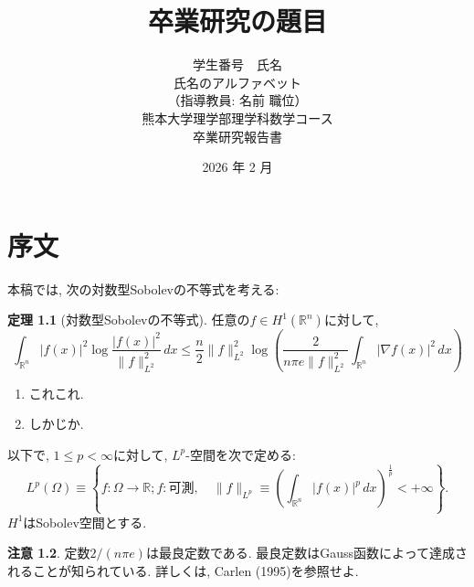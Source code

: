 \documentclass[12pt,a4j,twoside]{jreport}
\numberwithin{equation}{chapter}
\theoremstyle{definition} %
\newtheorem{thm}{定理}[chapter]
\newtheorem{rem}[thm]{注意}
\newcommand{\R}{{\mathbb R}} %
\newcommand{\nab}{\nabla} %
\newcommand{\Om}{\Omega} %
\newcommand{\eqn}[1]{\begin{equation}#1\end{equation}}
\begin{document}
\title{ %
\huge 卒業研究の題目 \\[5cm]
}
\author{学生番号　氏名 \\
\qquad\qquad\quad 氏名のアルファベット\\[1cm]
（指導教員: 名前 職位） \\[1cm]
熊本大学理学部理学科数学コース \\
卒業研究報告書}
\date{\Large 2026 年 2 月} %
\maketitle %
\thispagestyle{empty} 
\clearpage
\tableofcontents %
\thispagestyle{empty}
\newpage
\setcounter{page}{1}
\renewcommand{\thepage}{\arabic{page}} 


\chapter{序文}%

本稿では, 次の対数型Sobolevの不等式を考える: 

\begin{thm}[対数型Sobolevの不等式] \label{thm:dareka}
任意の$f \in H^1(\R^n)$に対して, 
\eqn{
   \int_{\R^n} |f(x)|^2 \log\frac{|f(x)|^2}{\|f\|_{L^2}^2}\, dx
   \leq \frac{n}{2} \|f\|_{L^2}^2 \log\left(\frac{2}{n \pi e \|f\|_{L^2}^2} \int_{\R^n} |\nab f(x)|^2\, dx\right) 
 }
\begin{enumerate}
\item これこれ. 
\item しかじか. 
\end{enumerate}
\end{thm}


以下で, $1 \leq p < \infty$に対して, $L^p$-空間を次で定める:
\begin{equation}\label{dfn;Lp}
  L^p(\Om)
  \equiv \left\{f: \Om \to \R;f: \text{可測},\quad \|f\|_{L^p} \equiv \left(\int_{\R^n} |f(x)|^p\, dx\right)^\frac{1}{p} < + \infty\right\}.
\end{equation}
$H^1$はSobolev空間とする. 


\begin{rem}
定数$2/(n \pi e)$は最良定数である.
最良定数はGauss函数によって達成されることが知られている. 
詳しくは, Carlen (1995)を参照せよ. 
\end{rem}
\end{document}
